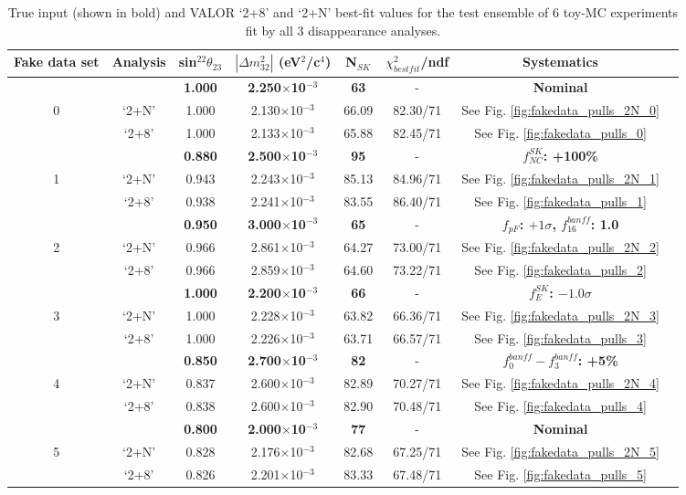 \begin{table}[b]
\centering
\begin{tabular}{| c | c | c  c | c  c  c | l |}
\hline
Fake data set & Analysis & sin$^22\theta_{23}$ & $|\Delta m_{32}^2|$ (eV$^{2}$/c$^{4}$) & N$_{SK}$ & $\chi^2_{bestfit}$/ndf & Systematics \\
\hline
  &       & {\bf 1.000} & {\bf 2.250$\times$10$^{-3}$} & {\bf 63} & - & {\bf Nominal} \\
0 & `2+N' & 1.000 & 2.130$\times$10$^{-3}$ & 66.09  & 82.30/71  & See Fig. \ref{fig:fakedata_pulls_2N_0} \\
  & `2+8' & 1.000 & 2.133$\times$10$^{-3}$ & 65.88 & 82.45/71   & See Fig. \ref{fig:fakedata_pulls_0} \\
\hline
  &       & {\bf 0.880} & {\bf 2.500$\times$10$^{-3}$} & {\bf 95} & - & {\bf $f^{SK}_{NC}$: +100\%} \\
1 & `2+N' & 0.943 & 2.243$\times$10$^{-3}$ & 85.13  & 84.96/71 & See Fig. \ref{fig:fakedata_pulls_2N_1} \\
  & `2+8' & 0.938 & 2.241$\times$10$^{-3}$ & 83.55 & 86.40/71  & See Fig. \ref{fig:fakedata_pulls_1} \\
\hline
  &       & {\bf 0.950} & {\bf 3.000$\times$10$^{-3}$} & {\bf 65} & - & {\bf $f_{pF}$: $+1\sigma$, $f_{16}^{banff}$: 1.0} \\
2 & `2+N' & 0.966 & 2.861$\times$10$^{-3}$ & 64.27  &  73.00/71 & See Fig. \ref{fig:fakedata_pulls_2N_2}\\
  & `2+8' & 0.966 & 2.859$\times$10$^{-3}$ & 64.60 & 73.22/71   & See Fig. \ref{fig:fakedata_pulls_2} \\
\hline 
  &       & {\bf 1.000} & {\bf 2.200$\times$10$^{-3}$} & {\bf 66} & - & {\bf $f^{SK}_{E}$: $-1.0\sigma$} \\
3 & `2+N' & 1.000 & 2.228$\times$10$^{-3}$ & 63.82  & 66.36/71 & See Fig. \ref{fig:fakedata_pulls_2N_3} \\
  & `2+8' & 1.000 & 2.226$\times$10$^{-3}$ & 63.71 & 66.57/71  & See Fig. \ref{fig:fakedata_pulls_3} \\
\hline
  &       & {\bf 0.850} & {\bf 2.700$\times$10$^{-3}$} & {\bf 82} & - & {\bf $f^{banff}_0-f^{banff}_3$: +5\%} \\
4 & `2+N' & 0.837 & 2.600$\times$10$^{-3}$ & 82.89 & 70.27/71   & See Fig. \ref{fig:fakedata_pulls_2N_4} \\
  & `2+8' & 0.838 & 2.600$\times$10$^{-3}$ & 82.90 & 70.48/71   & See Fig. \ref{fig:fakedata_pulls_4} \\
\hline
  &       & {\bf 0.800} & {\bf 2.000$\times$10$^{-3}$} & {\bf 77} & - & {\bf Nominal} \\
5 & `2+N' & 0.828 & 2.176$\times$10$^{-3}$ & 82.68 & 67.25/71  & See Fig. \ref{fig:fakedata_pulls_2N_5} \\
  & `2+8' & 0.826 & 2.201$\times$10$^{-3}$ & 83.33 & 67.48/71  & See Fig. \ref{fig:fakedata_pulls_5} \\
\hline
\end{tabular}
\caption{
  True input (shown in bold) and VALOR `2+8' and `2+N' best-fit values for the 
  test ensemble of 6 toy-MC experiments fit by all 3 disappearance analyses.
}
\label{tab:toymc_fits:best_fit_values}
\end{table}


